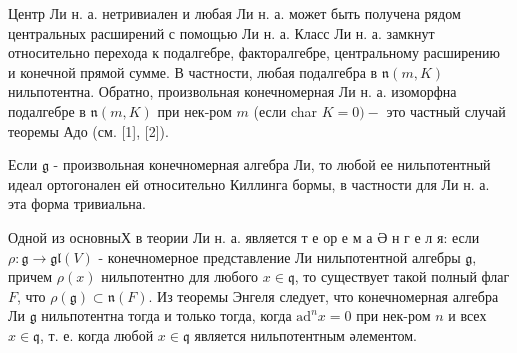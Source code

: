 \documentclass[10pt]{article}
\begin{document}
Центр Ли н. а. нетривиален и любая Ли н. а. может быть получена рядом центральных расширений с помощью Ли н. а. Класс Ли н. а. замкнут относительно перехода к подалгебре, факторалгебре, центральному расширению и конечной прямой сумме. В частности, любая подалгебра в $\mathfrak{n}(m, K)$ нильпотентна. Обратно, произвольная конечномерная Ли н. а. изоморфна подалгебре в $\mathfrak{n}(m, K)$ при нек-ром $m$ (если char $K=0)-$ это частный случай теоремы Адо (см. [1], [2]).



Если $\mathfrak{g}$ - произвольная конечномерная алгебра Ли, то любой ее нильпотентный идеал ортогонален ей относительно Киллинга бормы, в частности для Ли н. а. эта форма тривиальна.



Одной из основныХ в теории Ли н. а. является т е ор е м а Ә н г е л я: если $\rho: \mathfrak{g} \rightarrow \mathfrak{g l}(V)$ - конечномерное представление Ли нильпотентной алгебры $\mathfrak{g}$, причем $\rho(x)$ нильпотентно для любого $x \in \mathfrak{q}$, то существует такой полный флаг $F$, что $\rho(\mathfrak{g}) \subset \mathfrak{n}(F)$. Из теоремы Энгеля следует, что конечномерная алгебра Ли $\mathfrak{g}$ нильпотентна тогда и только тогда, когда $\mathrm{ad}^{n} x=0$ при нек-ром $n$ и всех $x \in \mathfrak{q}$, т. е. когда любой $x \in \mathfrak{q}$ является нильпотентным әлементом.
\end{document}
